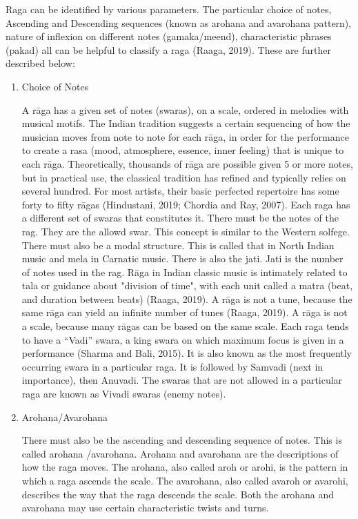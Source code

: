 \doublespacing
\setlength{\parindent}{1cm}

\par

Raga can be identified by various parameters. The particular choice of notes, Ascending and Descending sequences (known as arohana and avarohana pattern), nature of inflexion on different notes (gamaka/meend), characteristic phrases (pakad) all can be helpful to classify a raga (Raaga, 2019). These are further described below:

\begin{enumerate}
  \item Choice of Notes \par
  A rāga has a given set of notes (swaras), on a scale, ordered in melodies with musical motifs. The Indian tradition suggests a certain sequencing of how the musician moves from note to note for each rāga, in order for the performance to create a rasa (mood, atmosphere, essence, inner feeling) that is unique to each rāga. Theoretically, thousands of rāga are possible given 5 or more notes, but in practical use, the classical tradition has refined and typically relies on several hundred. For most artists, their basic perfected repertoire has some forty to fifty rāgas (Hindustani, 2019; Chordia and Ray, 2007). Each raga has a different set of swaras that constitutes it. There must be the notes of the rag.  They are the allowd swar.  This concept is similar to the Western solfege. There must also be a modal structure.  This is called that in North Indian music and mela in Carnatic music. There is also the jati.  Jati is the number of notes used in the rag. Rāga in Indian classic music is intimately related to tala or guidance about "division of time", with each unit called a matra (beat, and duration between beats) (Raaga, 2019). A rāga is not a tune, because the same rāga can yield an infinite number of tunes (Raaga, 2019).  A rāga is not a scale, because many rāgas can be based on the same scale. Each raga tends to have  a “Vadi” swara, a king swara on which maximum focus is given in a performance (Sharma and Bali, 2015).  It is also known as the most frequently occurring swara in a particular raga. It is followed by Samvadi (next in importance), then Anuvadi.  The swaras that are not allowed in a particular raga are known as Vivadi swaras (enemy notes).
  \par
  \item Arohana/Avarohana \par
  There must also be the ascending and descending sequence of notes.  This is called arohana /avarohana. Arohana and avarohana are the descriptions of how the raga moves.  The arohana, also called aroh or arohi, is the pattern in which a raga ascends the scale.  The avarohana, also called avaroh or avarohi, describes the way that the raga descends the scale.  Both the arohana and avarohana may use certain characteristic twists and turns.

\end{enumerate}
